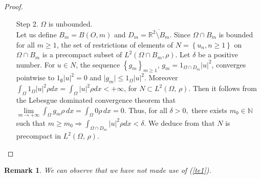 \documentclass[11pt]{article}
\newtheorem{remark}[theorem]{Remark}
\begin{document}
\begin{proof}
\begin{enumerate}
		{Letting $\varepsilon\to 0$, it follows that} 
		$$k,j\geq k_0\Rightarrow \lVert \tilde{v}_{n_k}-\tilde{v}_{n_j}\rVert_{L^2(\Omega)} \leq \delta.$$ 
		{Therefore, $\left\{\tilde{v}_{n_k}\right\}_{k\geq 1}$  is a Cauchy sequence in $L^2(\Omega)$. So, there exists $\tilde{v} \in L^2(\Omega)$ such that $\tilde{v}_{n_k}     
			\longrightarrow \tilde{v}$ in $L^2(\Omega)$. That is
			\begin{align*}
				0=\lim\limits_{k\rightarrow \infty}  \int_{\Omega}^{} \mid \tilde{v}_{n_k}-\tilde{v} \mid^{2}dx_2&
				=\lim\limits_{k\rightarrow\infty}\int_{\Omega}^{}\mid \rho^{\frac{1}{2}} u_{n_k}-v\mid^2dx
				&=\lim\limits_{k\rightarrow\infty}\int_{\Omega}^{}\mid  u_{n_k}-v\rho^{\frac{-1}{2}}\mid^2\rho dx.
		\end{align*}}
		Hence {$u_{n_k}\longrightarrow v\rho^{\frac{-1}{2}}$} in $L^2(\Omega,\, \rho)$. Therefore, $\{u_{n_k}\}_{k \geq 1}$ is a subsequence of $\{u_n\}_{n \geq 1}$ which converges in $L^2(\Omega,\, \rho)$.  
		\item[Step 2.]  $\Omega$ is unbounded.\\ Let us define $B_m=B(O,m)$  and $D_m= \overline{\mathbb{R}^2\setminus B_m}$. Since $\Omega\cap B_m$ is bounded
		for all {$m \geq 1$}, the set of restrictions of elements of  $N=\left\{u_n,n\geq 1\right\}$ on $\Omega\cap B_m$ is a {precompact} subset of $L^2({\Omega\cap B_m, \rho})$.
		Let $\delta$ be a positive number. For $u\in N$, the sequence $\left\{g_m\right\}_{m\geq 1}$, $g_m=1_{\Omega\cap D_m}\lvert u\rvert^2$, converges pointwise to $1_{\emptyset} \lvert u\rvert^2=0$ and   $\lvert g_m\rvert \leq  1_{\Omega}\lvert u \rvert^2$. Moreover {$\int_{\Omega} 1_{\Omega}\lvert u \rvert^2\rho dx =\int_{\Omega}^{}\lvert u \rvert^2\rho dx < +\infty$},  for  $N\subset L^2(\Omega,\,  \rho)$. Then it follows from the Lebesgue dominated convergence theorem  that {$\lim\limits_{m\to +\infty}\int_{\Omega}g_m\rho\, dx= \int_{\Omega} 0 \rho\,dx=0$.}
		Thus, for all $\delta>0,$ there exists $m_0\in \mathbb{N}$ such that $m\geq m_ 0\Rightarrow \int_{\Omega\cap D_m} \lvert u\rvert^2\rho dx < \delta.$
		We deduce from \cite[Proposition 2.1]{JH} that $N$ is {precompact} in $L^2(\Omega,\,\rho).$
	\end{enumerate}
\end{proof}

\begin{remark}{We can observe that we have not made use of (\ref{te1}).} 
\end{remark} 
\end{document}
